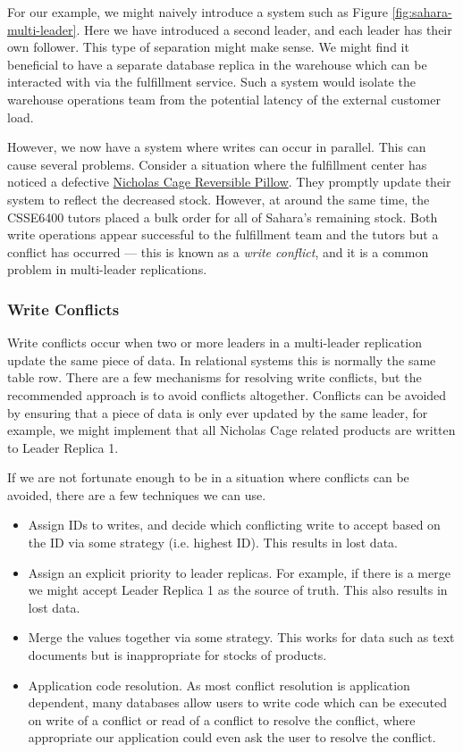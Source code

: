 For our example,
we might naively introduce a system such as Figure \ref{fig:sahara-multi-leader}.
Here we have introduced a second leader,
and each leader has their own follower.
This type of separation might make sense.
We might find it beneficial to have a separate database replica in the warehouse which can be interacted with via the fulfillment service.
Such a system would isolate the warehouse operations team from the potential latency of the external customer load.

However, we now have a system where writes can occur in parallel.
This can cause several problems.
Consider a situation where the fulfillment center has noticed a defective \href{https://www.amazon.com.au/dp/B09LYDDDR1}{Nicholas Cage Reversible Pillow}.
They promptly update their system to reflect the decreased stock.
However, at around the same time,
the CSSE6400 tutors placed a bulk order for all of Sahara's remaining stock.
Both write operations appear successful to the fulfillment team and the tutors but a conflict has occurred --- this is known as a \textsl{write conflict},
and it is a common problem in multi-leader replications. 

\subsubsection*{Write Conflicts}
Write conflicts occur when two or more leaders in a multi-leader replication update the same piece of data.
In relational systems this is normally the same table row.
There are a few mechanisms for resolving write conflicts,
but the recommended approach is to avoid conflicts altogether.
Conflicts can be avoided by ensuring that a piece of data is only ever updated by the same leader,
for example, we might implement that all Nicholas Cage related products are written to Leader Replica 1.

If we are not fortunate enough to be in a situation where conflicts can be avoided,
there are a few techniques we can use.

\begin{itemize}
    \item Assign IDs to writes, and decide which conflicting write to accept based on the ID via some strategy (i.e. highest ID). This results in lost data.
    \item Assign an explicit priority to leader replicas. For example, if there is a merge we might accept Leader Replica 1 as the source of truth. This also results in lost data.
    \item Merge the values together via some strategy. This works for data such as text documents but is inappropriate for stocks of products.
    \item Application code resolution. As most conflict resolution is application dependent, many databases allow users to write code which can be executed on write of a conflict or read of a conflict to resolve the conflict, where appropriate our application could even ask the user to resolve the conflict.
\end{itemize}

